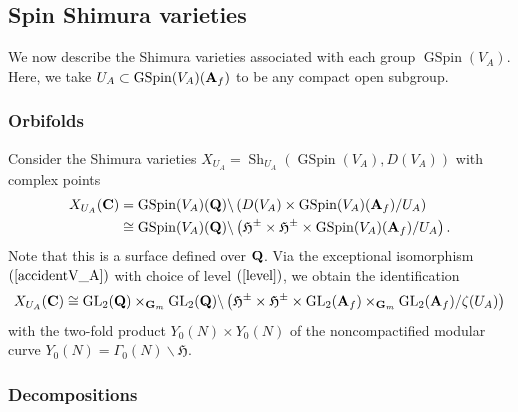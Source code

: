 \documentclass{amsart}
\theoremstyle{definition}
\begin{document}
\subsection{Spin Shimura varieties}
 
We now describe the Shimura varieties associated with each group $\operatorname{GSpin}(V_A)$.
Here, we take $U_A \subset \operatorname{GSpin}(V_A)({\bf{A}}_f)$ to be any compact open subgroup. 
 
\subsubsection{Orbifolds} 

Consider the Shimura varieties $X_{U_A} = \operatorname{Sh}_{U_A}(\operatorname{GSpin}(V_A), D(V_A))$ with complex points  
\begin{align*} X_{U_A}({\bf{C}}) 
&= \operatorname{GSpin}(V_A)({\bf{Q}}) \backslash \left( D(V_A) \times \operatorname{GSpin}(V_A) ( {\bf{A}}_f ) / U_A \right) \\
&\cong \operatorname{GSpin}(V_A)({\bf{Q}}) \backslash \left( \mathfrak{H}^{\pm} \times \mathfrak{H}^{\pm} \times \operatorname{GSpin}(V_A) ( {\bf{A}}_f ) / U_A \right). \end{align*}
Note that this is a surface defined over ${\bf{Q}}$. 
Via the exceptional isomorphism $(\ref{accidentV_A})$ with choice of level $(\ref{level})$, we obtain the identification
\begin{align*} X_{U_A}({\bf{C}}) \cong  \operatorname{GL}_2({\bf{Q}}) \times_{{\bf{G}}_m} \operatorname{GL}_2({\bf{Q}}) \backslash \left( \mathfrak{H}^{\pm} \times \mathfrak{H}^{\pm} \times 
 \operatorname{GL}_2({\bf{A}}_f) \times_{{\bf{G}}_m} \operatorname{GL}_2({\bf{A}}_f) / \zeta(U_A) \right) \end{align*}
with the two-fold product $Y_0(N) \times Y_0(N)$ of the noncompactified modular curve $Y_0(N) = \Gamma_0(N) \backslash \mathfrak{H}$. 

\subsubsection{Decompositions}
\end{document}
